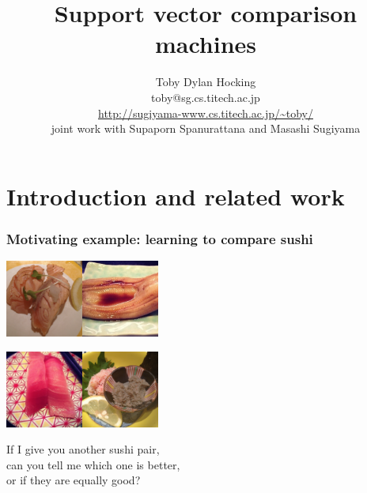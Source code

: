 \documentclass{beamer}
\begin{document}
\title{Support vector comparison machines}
\author{
Toby Dylan Hocking\\
toby@sg.cs.titech.ac.jp\\
\url{http://sugiyama-www.cs.titech.ac.jp/~toby/}\\
joint work with Supaporn Spanurattana and Masashi Sugiyama
}


\maketitle

\section{Introduction and related work}

\begin{frame}
  \frametitle{Motivating example: learning to compare sushi}
  \includegraphics[width=1in]{sushi_salmon}\includegraphics[width=1in]{sushi_anago}

\includegraphics[width=1in]{sushi_chu-toro}\includegraphics[width=1in]{sushi_kani-miso}

If I give you another sushi pair,\\
can you tell me which one is better,\\
\alert<2>{or if they are equally good?}
\end{frame}
\end{document}
